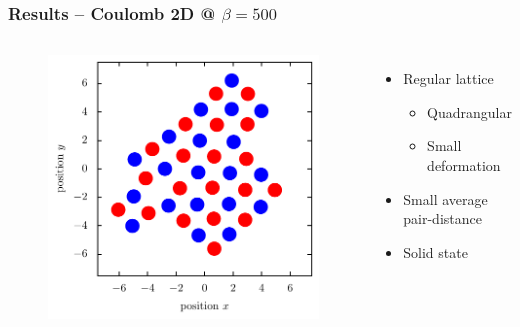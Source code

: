 \documentclass[mathserif,serif]{beamer}
\begin{document}
\begin{frame}
	\frametitle{Results -- Coulomb 2D @ $\beta=500$}
	\centering
	\begin{columns}	
	\begin{figure}
	\includegraphics[width=\textwidth]{../report/figures/Kristall_3_beta_500.pdf}
	\end{figure}
	\begin{itemize}
	\item Regular lattice
	\begin{itemize}
		\item Quadrangular
		\item Small deformation
	\end{itemize}
	\item Small average pair-distance
	\item Solid state
	\end{itemize}
\end{columns}
\end{frame}
\end{document}
